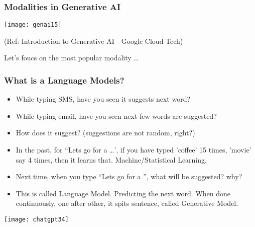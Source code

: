 \begin{frame}[fragile]\frametitle{Modalities in Generative AI}

\begin{center}
\texttt{[image: genai15]}
\end{center}


{\tiny (Ref: Introduction to Generative AI - Google Cloud Tech)}

Let's foucs on the most popular modality \ldots

\end{frame}


\begin{frame}[fragile]\frametitle{What is a Language Models?}

\begin{itemize}
\item While typing SMS, have you seen it suggests next word?
\item While typing email, have you seen next few words are suggested?
\item How does it suggest? (suggestions are not random, right?)
\item In the past, for ``Lets go for a \ldots', if you have typed 'coffee' 15 times, 'movie' say 4 times, then it learns that. Machine/Statistical Learning.
\item Next time, when you type ``Lets go for a '', what will be suggested? why?
\item This is called Language Model. Predicting the next word. When done continuously, one after other, it spits sentence, called Generative Model.
\end{itemize}	

\begin{center}
\texttt{[image: chatgpt34]}
\end{center}		

\end{frame}

